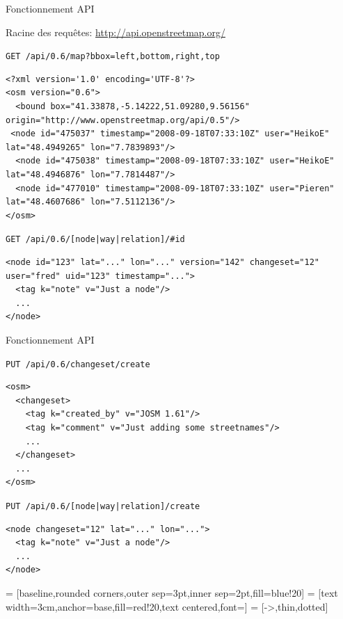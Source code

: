 \begin{frame}[fragile]{Fonctionnement API} \vfill

Racine des requêtes: \url{http://api.openstreetmap.org/} \bigskip

\texttt{GET /api/0.6/map?bbox={\color{purple}left},{\color{purple}bottom},{\color{purple}right},{\color{purple}top}}

{\tiny
\begin{verbatim}
<?xml version='1.0' encoding='UTF-8'?>
<osm version="0.6">
  <bound box="41.33878,-5.14222,51.09280,9.56156" origin="http://www.openstreetmap.org/api/0.5"/>
 <node id="475037" timestamp="2008-09-18T07:33:10Z" user="HeikoE" lat="48.4949265" lon="7.7839893"/>
  <node id="475038" timestamp="2008-09-18T07:33:10Z" user="HeikoE" lat="48.4946876" lon="7.7814487"/>
  <node id="477010" timestamp="2008-09-18T07:33:10Z" user="Pieren" lat="48.4607686" lon="7.5112136"/>
</osm>
\end{verbatim}
}
\bigskip

\texttt{GET /api/0.6/[{\color{purple}node|way|relation}]/\#id}

{\tiny
\begin{verbatim}
<node id="123" lat="..." lon="..." version="142" changeset="12" user="fred" uid="123" timestamp="...">
  <tag k="note" v="Just a node"/>
  ...
</node>
\end{verbatim}
}

\end{frame}


\begin{frame}[fragile]{Fonctionnement API} \vfill

\texttt{PUT /api/0.6/changeset/create}
{\small
\begin{verbatim}
<osm>
  <changeset>
    <tag k="created_by" v="JOSM 1.61"/>
    <tag k="comment" v="Just adding some streetnames"/>
    ...
  </changeset>
  ...
</osm>
\end{verbatim}
}

\bigskip

\texttt{PUT /api/0.6/[{\color{purple}node|way|relation}]/create}
{\small
\begin{verbatim}
<node changeset="12" lat="..." lon="...">
  <tag k="note" v="Just a node"/>
  ...
</node>
\end{verbatim}
}
\end{frame}


    = [baseline,rounded corners,outer sep=3pt,inner sep=2pt,fill=blue!20]
 = [text width=3cm,anchor=base,fill=red!20,text centered,font={\sffamily\tiny}]
   = [->,thin,dotted]


